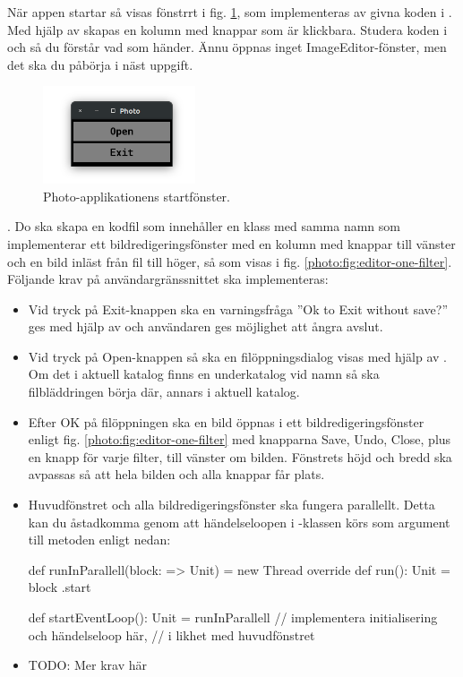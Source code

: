 När appen startar så visas fönstrrt i fig. \ref{photo:fig:main-window}, som implementeras av givna koden i . Med hjälp av  skapas en kolumn med knappar som är klickbara. Studera koden i  och  så du förstår vad som händer. Ännu öppnas inget ImageEditor-fönster, men det ska du påbörja i näst uppgift.

\begin{figure}[H]
\centering
\includegraphics[width=0.4\textwidth]{../img/w12-assignment-photo/photo-main.png}
\caption{Photo-applikationens startfönster.}
\label{photo:fig:main-window}
\end{figure}

\Task \textbf{}. Do ska skapa en kodfil  som innehåller en klass med samma namn som implementerar ett bildredigeringsfönster med en kolumn med knappar till vänster och en bild inläst från fil till höger, så som visas i fig. \ref{photo:fig:editor-one-filter}. Följande krav på användargränssnittet ska implementeras:

\begin{itemize}
\item Vid tryck på Exit-knappen ska en varningsfråga ''Ok to Exit without save?'' ges med hjälp av  och användaren ges möjlighet att ångra avslut.
\item Vid tryck på Open-knappen så ska en filöppningsdialog visas med hjälp av . Om det i aktuell katalog finns en underkatalog vid namn  så ska filbläddringen börja där, annars i aktuell katalog. 
\item Efter OK på filöppningen ska en bild öppnas i ett bildredigeringsfönster enligt fig. \ref{photo:fig:editor-one-filter} med knapparna Save, Undo, Close, plus en knapp för varje filter, till vänster om bilden. Fönstrets höjd och bredd ska avpassas så att hela bilden och alla knappar får plats.
\item Huvudfönstret och alla bildredigeringsfönster ska fungera parallellt. Detta kan du åstadkomma genom att händelseloopen i -klassen körs som argument till metoden  enligt nedan: 
\begin{CodeSmall}
  def runInParallell(block: => Unit) = 
    new Thread{ override def run(): Unit = block }.start

  def startEventLoop(): Unit = runInParallell {
    // implementera initialisering och händelseloop här, 
    // i likhet med huvudfönstret 
  }
\end{CodeSmall}
\item TODO: Mer krav här
\end{itemize}

